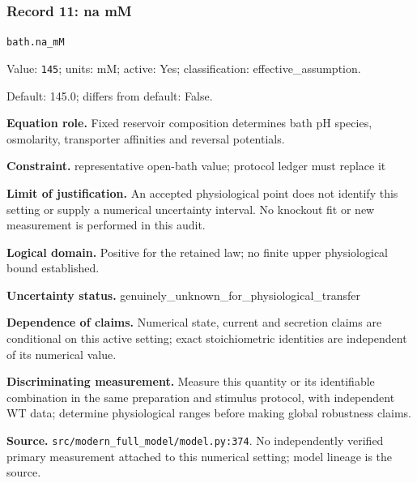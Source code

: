 \subsubsection*{Record 11: na mM}
{\small \nolinkurl{bath.na_mM}\par

Value: \texttt{145}; units: mM; active: Yes; classification: effective\_assumption.\par

Default: 145.0; differs from default: False.\par

\textbf{Equation role.} Fixed reservoir composition determines bath pH species, osmolarity, transporter affinities and reversal potentials.\par

\textbf{Constraint.} representative open-bath value; protocol ledger must replace it\par

\textbf{Limit of justification.} An accepted physiological point does not identify this setting or supply a numerical uncertainty interval. No knockout fit or new measurement is performed in this audit.\par

\textbf{Logical domain.} Positive for the retained law; no finite upper physiological bound established.\par

\textbf{Uncertainty status.} genuinely\_unknown\_for\_physiological\_transfer\par

\textbf{Dependence of claims.} Numerical state, current and secretion claims are conditional on this active setting; exact stoichiometric identities are independent of its numerical value.\par

\textbf{Discriminating measurement.} Measure this quantity or its identifiable combination in the same preparation and stimulus protocol, with independent WT data; determine physiological ranges before making global robustness claims.\par

\textbf{Source.} \nolinkurl{src/modern_full_model/model.py:374}. No independently verified primary measurement attached to this numerical setting; model lineage is the source.\par}

